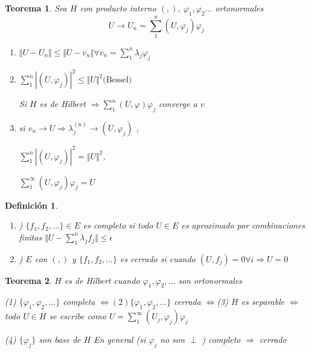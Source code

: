 \documentclass[a4paper,10pt]{book}
\newtheorem{definition}{Definición}
\newtheorem{theorem}{Teorema}
\begin{document}
\begin{theorem}
\label{Theorem:1}
Sea $H$ con  producto interno $(,)$, $\varphi_1,\varphi_2\ldots$  ortonormales  
\[
U\rightarrow U_n = \sum\limits_1^n (U,\varphi_j)\varphi_j
\]

\begin{enumerate}
    \item $\Vert U-U_n\Vert \leq \Vert U- v_n\Vert  \forall v_n = \sum\limits_1^n \lambda_j\varphi_j$
    \item $\sum\limits_1^n |(U,\varphi_j)|^2 \leq \Vert U\Vert ^2  \text{(Bessel)}$
    
    Si $H$ es de Hilbert $\Rightarrow \sum\limits_1^n (U,\varphi) \varphi_j $ converge a $v$
    \item si $v_n \rightarrow U  \Rightarrow \lambda_j^{(n)} \rightarrow (U,\varphi_j)$ , 
    
    $\sum\limits_1^n |(U,\varphi_j)|^2 = \Vert U \Vert^2$,
    
    $\sum\limits_{1}^{\infty} (U,\varphi_j) \varphi_j = U$
    
\end{enumerate}
\end{theorem}

\begin{definition}
\begin{enumerate}[label=\alph*]

\item) $\{f_1,f_2,\ldots   \}\in E$ es completo si todo $U\in E$ es aproximado por combinaciones finitas
$\Vert U-\sum\limits_1^n \lambda_j f_j \Vert \leq \epsilon$
\item) $E$ con $(,)$  y $\{ f_1,f_2,\ldots\}$ es cerrado si cuando $(U,f_j)=0 \forall i \Rightarrow U=0$ 
\end{enumerate}
\end{definition}

\begin{theorem}
    $H$ es de Hilbert cuando $\varphi_1,\varphi_2,\ldots$  son ortonormales 
    
    (1) $ \{ \varphi_1, \varphi_2,\ldots\}$ completa  $\Leftrightarrow (2) \{ \varphi_1,\varphi_2,\ldots \}$ cerrada    $\Leftrightarrow$(3) $H$  es separable  $\Leftrightarrow$ todo $U\in H $ se escribe como $U= \sum\limits_1^\infty (U_j,\varphi_j) \varphi_j$

    (4) $\{ \varphi_j \}$ son base de $H$ En general (si $\varphi_j$ no son $\perp$ ) completo $\Rightarrow$ cerrado
\end{theorem}
\end{document}
